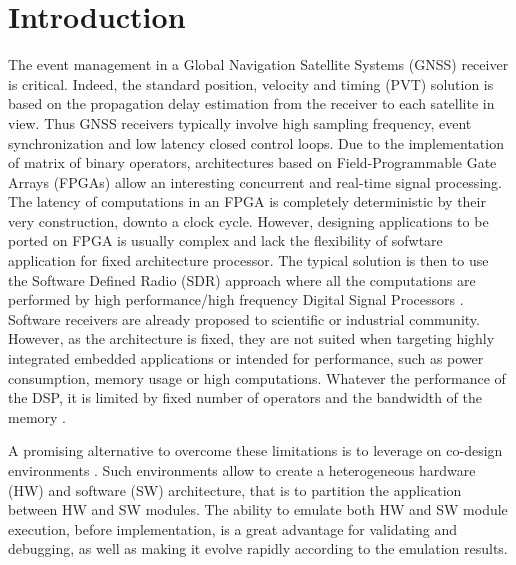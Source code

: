 \documentclass[conference]{IEEEtran}
\begin{document}
\section{Introduction}
The event management in a Global Navigation Satellite Systems (GNSS) receiver is critical. Indeed, the standard position, velocity and timing (PVT) solution is based on the propagation delay estimation from the receiver to each satellite in view. Thus GNSS receivers typically involve high sampling frequency, event synchronization and low latency closed control loops. Due to the implementation of matrix of binary operators, architectures based on Field-Programmable Gate Arrays (FPGAs) allow an interesting concurrent and real-time signal processing. The latency of computations in an FPGA is completely deterministic by their very construction, downto a clock cycle. However, designing applications to be ported on FPGA is usually complex and lack the flexibility of sofwtare application for fixed architecture processor. The typical solution is then to use the Software Defined Radio (SDR) approach where all the computations are performed by high performance/high frequency Digital Signal Processors \cite{Maj18}. Software receivers are already proposed to scientific or industrial community. However, as the architecture is fixed, they are not suited when targeting highly integrated embedded applications or intended for performance, such as power consumption, memory usage or high computations. Whatever the performance of the DSP, it is limited by fixed number of operators and the bandwidth of the memory \cite{Row04}.

A promising alternative to overcome these limitations is to leverage on co-design environments \cite{Dion10}. Such environments allow to create a heterogeneous hardware (HW) and software (SW) architecture, that is to partition the application between HW and SW modules. The ability to emulate both HW and SW module execution, before implementation, is a great advantage for validating and debugging, as well as making it evolve rapidly according to the emulation results.  
\end{document}

